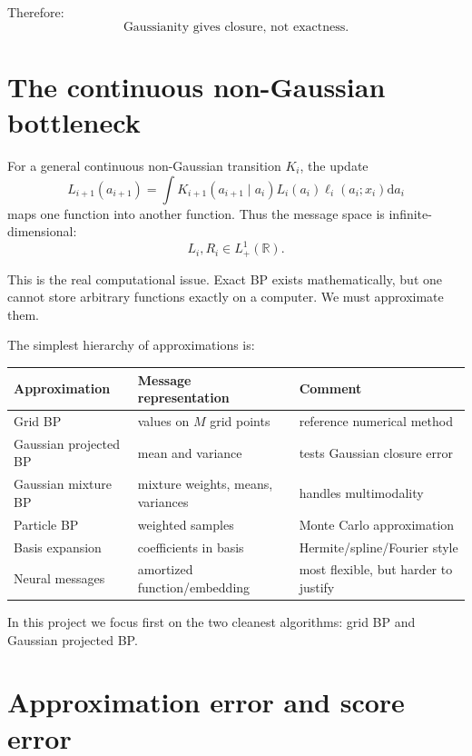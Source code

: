 \documentclass[11pt]{article}
\newcommand{\R}{\mathbb{R}}
\begin{document}
Therefore:
\[
\boxed{\text{Gaussianity gives closure, not exactness.}}
\]

\section{The continuous non-Gaussian bottleneck}

For a general continuous non-Gaussian transition \(K_i\), the update
\begin{equation}
  L_{i+1}(a_{i+1})
  =
  \int
  K_{i+1}(a_{i+1}\mid a_i)
  L_i(a_i)\ell_i(a_i;x_i)
  \mathrm{d}a_i
\end{equation}
maps one function into another function. Thus the message space is infinite-dimensional:
\begin{equation}
  L_i,R_i\in L^1_+(\R).
\end{equation}

This is the real computational issue. Exact BP exists mathematically, but one cannot store arbitrary functions exactly on a computer. We must approximate them.

The simplest hierarchy of approximations is:
\begin{center}
\begin{tabular}{lll}
\toprule
Approximation & Message representation & Comment \\
\midrule
Grid BP & values on \(M\) grid points & reference numerical method \\
Gaussian projected BP & mean and variance & tests Gaussian closure error \\
Gaussian mixture BP & mixture weights, means, variances & handles multimodality \\
Particle BP & weighted samples & Monte Carlo approximation \\
Basis expansion & coefficients in basis & Hermite/spline/Fourier style \\
Neural messages & amortized function/embedding & most flexible, but harder to justify \\
\bottomrule
\end{tabular}
\end{center}

In this project we focus first on the two cleanest algorithms: grid BP and Gaussian projected BP.

\section{Approximation error and score error}
\end{document}
